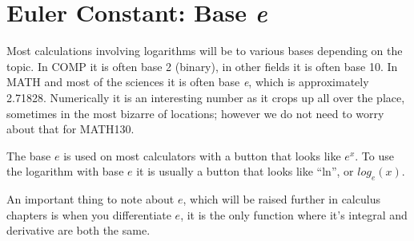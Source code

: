 \section{Euler Constant: Base \emph{e}}
\label{sec:EulerConstantBaseE}
Most calculations involving logarithms will be to various bases depending on
the topic. In COMP it is often base 2 (binary), in other fields it is often base
10. In MATH and most of the sciences it is often base \emph{e}, which is
approximately 2.71828.\cite{duWGx} Numerically it is an interesting number as it
crops up all over the place, sometimes in the most bizarre of locations; however
we do not need to worry about that for MATH130.

The base $e$ is used on most calculators with a button that looks like $e^x$. To
use the logarithm with base $e$ it is usually a button that looks like ``ln'', or
$log_e(x)$.

An important thing to note about $e$, which will be raised further in calculus
chapters is when you differentiate $e$, it is the only function where it's
integral and derivative are both the same.   